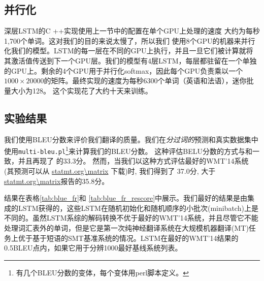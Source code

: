 \subsection{并行化}

深层LSTM的C ++实现使用上一节中的配置在单个GPU上处理的速度
大约为每秒1,700个单词。这对我们的目的来说太慢了，所以我们
使用8个GPU的机器来并行化我们的模型。LSTM的每一层在不同的GPU上执行，并且一旦它们被计算就将其激活值传送到下一个GPU层。我们的模型有4层LSTM，每层都驻留在一个单独的GPU上。剩余的4个GPU用于并行化softmax，因此每个GPU负责乘以一个$1000\times 20000$的矩阵。最终实现的速度为每秒6300个单词（英语和法语），迷你批量大小为128。
这个实现花了大约十天来训练。

\subsection{实验结果}

我们使用BLEU分数\cite{bleu}来评价我们翻译的质量。我们在\emph{分过词的}预测和真实数据集中使用\texttt{multi-bleu.pl}\footnote{有几个BLEU分数的变体，每个变体用perl脚本定义。}来计算我们的BLEU分数。
这种评估BELU分数的方式与\cite{cho14}和\cite{bog14}一致，并且再现了
\cite{wmt14_en_fr}的33.3分。
然而，当我们以这种方式评估最好的WMT'14系统 \cite{durrani-EtAl:2014:W14-33}
(其预测可以从 \url{statmt.org\matrix} 下载)时, 我们得到了   
37.0分, 大于 \url{statmt.org\matrix}报告的35.8分。  





结果在表格\ref{tab:blue_fr}和
\ref{tab:blue_fr_rescore}中展示。我们最好的结果是由集成的LSTM获得的，这些LSTM在随机初始化和随机顺序的小批次(minibatch)上是不同的。虽然LSTM系综的解码转换不优于最好的WMT'14系统，并且尽管它不能处理词汇表外的单词，但是它是第一次纯神经翻译系统在大规模机器翻译(MT)任务上优于基于短语的SMT基准系统的情况。LSTM在最好的WMT'14结果的0.5BLEU点内，如果它用于分辨1000最好基线系统列表。

